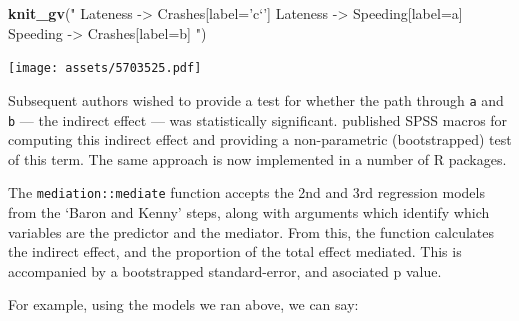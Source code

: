 \documentclass[]{article}
\newenvironment{Shaded}{\begin{snugshade}}{\end{snugshade}}
\newcommand{\KeywordTok}[1]{\textcolor[rgb]{0.13,0.29,0.53}{\textbf{#1}}}
\newcommand{\NormalTok}[1]{#1}
\newcommand{\StringTok}[1]{\textcolor[rgb]{0.31,0.60,0.02}{#1}}
\begin{document}
\begin{Shaded}
\begin{Highlighting}[]
\KeywordTok{knit_gv}\NormalTok{(}\StringTok{"}
\StringTok{Lateness -> Crashes[label='c`']}
\StringTok{Lateness -> Speeding[label=a]}
\StringTok{Speeding -> Crashes[label=b]}
\StringTok{"}\NormalTok{)}
\end{Highlighting}
\end{Shaded}

\texttt{[image: assets/5703525.pdf]}

Subsequent authors wished to provide a test for whether the path through \texttt{a} and
\texttt{b} --- the indirect effect --- was statistically significant.
\citet{preacher_spss_2004} published SPSS macros for computing this indirect effect and
providing a non-parametric (bootstrapped) test of this term. The same approach
is now implemented in a number of R packages.

The \texttt{mediation::mediate} function accepts the 2nd and 3rd regression models from
the `Baron and Kenny' steps, along with arguments which identify which variables
are the predictor and the mediator. From this, the function calculates the
indirect effect, and the proportion of the total effect mediated. This is
accompanied by a bootstrapped standard-error, and asociated p value.

For example, using the models we ran above, we can say:
\end{document}
